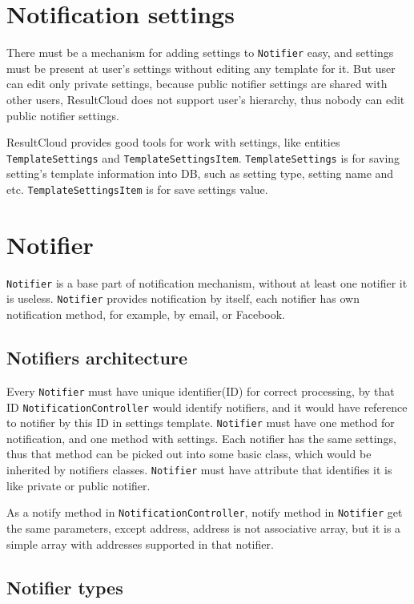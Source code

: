 \section{Notification settings}

There must be a mechanism for adding settings to \texttt{Notifier} easy, and settings must be present at user's settings without editing any template for it. But user can edit only private settings, because public notifier settings are shared with other users, ResultCloud does not support user's hierarchy, thus nobody can edit public notifier settings.

ResultCloud provides good tools for work with settings, like entities \texttt{TemplateSettings} and \texttt{TemplateSettingsItem}. \texttt{TemplateSettings} is for saving setting's template information into DB, such as setting type, setting name and etc. \texttt{TemplateSettingsItem} is for save settings value.

\section{Notifier}

\texttt{Notifier} is a base part of notification mechanism, without at least one notifier it is useless. \texttt{Notifier} provides notification by itself, each notifier has own notification method, for example, by email, or Facebook.

\subsection{Notifiers architecture}

Every \texttt{Notifier} must have unique identifier(ID) for correct processing, by that ID \texttt{Notifica\-tion\-Controller} would identify notifiers, and it would have reference to notifier by this ID in settings template. \texttt{Notifier} must have one method for notification, and one method with settings. Each notifier has the same settings, thus that method can be picked out into some basic class, which would be inherited by notifiers classes. \texttt{Notifier} must have attribute that identifies it is like private or public notifier.

As a notify method in \texttt{NotificationController}, notify method in \texttt{Notifier} get the same parameters, except address, address is not associative array, but it is a simple array with addresses supported in that notifier. 

\subsection{Notifier types}

